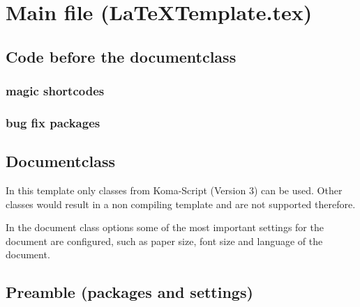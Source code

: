 \chapter{Main file (LaTeXTemplate.tex)}
\label{chap:doc:MainFile}

\section{Code before the documentclass}
\label{sec:main:prefix}

\subsection{magic shortcodes}

\subsection{bug fix packages}

\section{Documentclass}
\label{sec:main:class}
In this template only classes from Koma-Script (Version 3) can be used.
Other classes would result in a non compiling template and are not supported therefore. 

In the document class options some of the most important settings for the document are configured, such as paper size, font size and language of the document.

\section{Preamble (packages and settings)}
\label{sec:doc:preamble}

